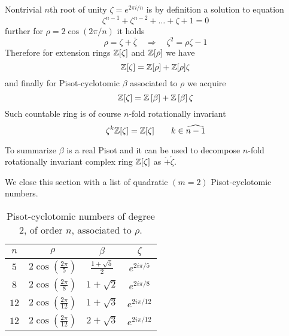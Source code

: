 \documentclass[text.tex]{subfiles}
\begin{document}
Nontrivial $n$th root of unity $\zeta = e^{2\pi i/n}$ is by definition a solution to equation
$$\zeta^{n-1}+\zeta^{n-2}+\dots+\zeta+1 = 0$$
further for $\rho = 2\cos\left(2\pi/n\right)$ it holds
$$\rho = \zeta + \bar{\zeta}\quad\Rightarrow\quad \zeta^2 = \rho\zeta - 1$$
Therefore for extension rings $\mathbb{Z}[\zeta]$ and $\mathbb{Z}[\rho]$ we have
$$\mathbb{Z}[\zeta] = \mathbb{Z}[\rho] + \mathbb{Z}[\rho]\zeta$$
and finally for Pisot-cyclotomic $\beta$ associated to $\rho$ we acquire
$$\mathbb{Z}[\zeta] = \mathbb{Z}\left[\beta\right] + \mathbb{Z}\left[\beta\right]\zeta$$
Such countable ring is of course $n$-fold rotationally invariant
$$\zeta^k\mathbb{Z}[\zeta] = \mathbb{Z}[\zeta]\qquad k\in\widehat{n-1}$$

To summarize $\beta$ is a real Pisot and it can be used to decompose $n$-fold rotationally invariant complex ring $\mathbb{Z}[\zeta]$ as $\ring + \ring\zeta$. 

We close this section with a list of quadratic $(m=2)$ Pisot-cyclotomic numbers. 

\begin{table}[h!]
\centering
\begin{tabular}{cccc}
$n$ & $\rho$ & $\beta$ & $\zeta$ \\
\hline
$5$   & $2 \cos\left(\frac{2\pi}{5}\right)$   & $\frac{1+\sqrt{5}}{2} $    & $e^{2i\pi/5}$ \\
$8$   & $2 \cos\left(\frac{2\pi}{8}\right)$   & $ 1+\sqrt{2} $      & $e^{2i\pi/8}$ \\
$12$  & $2 \cos\left(\frac{2\pi}{12}\right)$  & $ 1+\sqrt{3} $     & $e^{2i\pi/12}$ \\
$12$  & $2 \cos\left(\frac{2\pi}{12}\right)$  & $ 2+\sqrt{3} $                & $e^{2i\pi/12}$ \\
\end{tabular}
\caption{Pisot-cyclotomic numbers of degree $2$, of order $n$, associated to $\rho$.}
\end{table}




\end{document}
